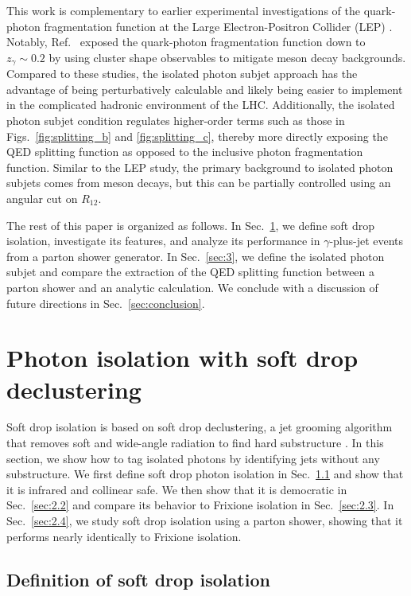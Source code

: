 \documentclass[a4paper,11pt]{article}
\DeclareRobustCommand{\Sec}[1]{Sec.~\ref{#1}}
\DeclareRobustCommand{\Figs}[2]{Figs.~\ref{#1} and \ref{#2}}
\DeclareRobustCommand{\Ref}[1]{Ref.~\cite{#1}}
\begin{document}
This work is complementary to earlier experimental investigations of the quark-photon fragmentation function at the Large Electron-Positron Collider (LEP) \cite{Buskulic:1995au, Glover:1993xc, GehrmannDeRidder:1997wx,Ackerstaff:1997nha}.
%
Notably, \Ref{Ackerstaff:1997nha} exposed the quark-photon fragmentation function down to $z_\gamma \sim 0.2$ by using cluster shape observables to mitigate meson decay backgrounds.
%
Compared to these studies, the isolated photon subjet approach has the advantage of being perturbatively calculable and likely being easier to implement in the complicated hadronic environment of the LHC.
%
Additionally, the isolated photon subjet condition regulates higher-order terms such as those in \Figs{fig:splitting_b}{fig:splitting_c}, thereby more directly exposing the QED splitting function as opposed to the inclusive photon fragmentation function.
%
Similar to the LEP study, the primary background to isolated photon subjets comes from meson decays, but this can be partially controlled using an angular cut on $R_{12}$.

The rest of this paper is organized as follows.
%
In \Sec{sec:2}, we define soft drop isolation, investigate its features, and analyze its performance in $\gamma$-plus-jet events from a parton shower generator.
%
In \Sec{sec:3}, we define the isolated photon subjet and compare the extraction of the QED splitting function between a parton shower and an analytic calculation.
%
We conclude with a discussion of future directions in \Sec{sec:conclusion}.

\section{Photon isolation with soft drop declustering}
\label{sec:2}

Soft drop isolation is based on soft drop declustering, a jet grooming algorithm that removes soft and wide-angle radiation to find hard substructure \cite{Larkoski:2014wba}.
%
In this section, we show how to tag isolated photons by identifying jets without any substructure.
%
We first define soft drop photon isolation in \Sec{sec:2.1} and show that it is infrared and collinear safe.
%
We then show that it is democratic in \Sec{sec:2.2} and compare its behavior to Frixione isolation in \Sec{sec:2.3}.
%
In \Sec{sec:2.4}, we study soft drop isolation using a parton shower, showing that it performs nearly identically to Frixione isolation.


\subsection{Definition of soft drop isolation}
\label{sec:2.1}
\end{document}
